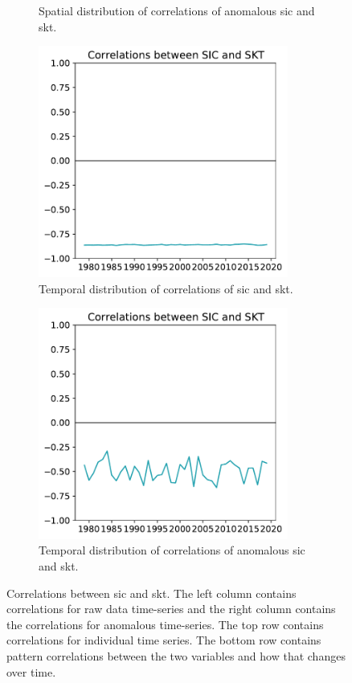 \documentclass[../main.tex]{subfiles}
\begin{document}
\begin{figure}[ht!]
\begin{subfigure}[ht!]{0.49\textwidth}
\caption{Spatial distribution of correlations of anomalous \gls{sic} and \gls{skt}.}
\end{subfigure}
\begin{subfigure}[ht!]{0.49\textwidth}
\centering
\includegraphics[width=0.9\textwidth]{images/week8/hres/corr_sic_skt_longterm_temporal}
\caption{Temporal distribution of correlations of \gls{sic} and \gls{skt}.}
\end{subfigure}
\begin{subfigure}[ht!]{0.49\textwidth}
\centering
\includegraphics[width=0.9\textwidth]{images/week8/hres/corr_sic_skt_longterm_temporal_anmomalous}
\caption{Temporal distribution of correlations of anomalous \gls{sic} and \gls{skt}.}
\end{subfigure}
\caption{Correlations between \gls{sic} and \gls{skt}. The left column contains correlations for raw data time-series and the right column contains the correlations for anomalous time-series. The top row contains correlations for individual time series. The bottom row contains pattern correlations between the two variables and how that changes over time.}
\label{fig:correlation_between_SIC_and_SKT.}
\end{figure}
\end{document}
